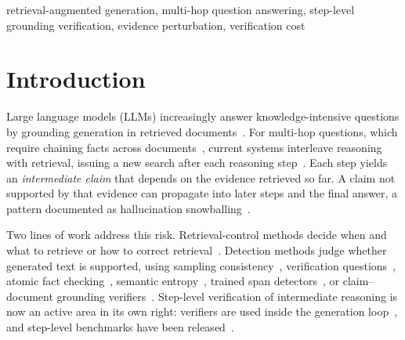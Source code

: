 \documentclass[conference]{IEEEtran}
\begin{document}
\begin{IEEEkeywords}
retrieval-augmented generation, multi-hop question answering, step-level grounding verification, evidence perturbation, verification cost
\end{IEEEkeywords}

\section{Introduction}
Large language models (LLMs) increasingly answer knowledge-intensive questions by grounding generation in retrieved documents~\cite{lewis2020rag}. For multi-hop questions, which require chaining facts across documents~\cite{yang2018hotpotqa,ho2020twowiki,trivedi2022musique}, current systems interleave reasoning with retrieval, issuing a new search after each reasoning step~\cite{yao2023react,trivedi2023ircot,jiang2023flare,jin2025searchr1}. Each step yields an \emph{intermediate claim} that depends on the evidence retrieved so far. A claim not supported by that evidence can propagate into later steps and the final answer, a pattern documented as hallucination snowballing~\cite{zhang2024snowball}.

Two lines of work address this risk. Retrieval-control methods decide when and what to retrieve or how to correct retrieval~\cite{asai2024selfrag,yan2024crag,jeong2024adaptive}. Detection methods judge whether generated text is supported, using sampling consistency~\cite{manakul2023selfcheckgpt}, verification questions~\cite{dhuliawala2024cove}, atomic fact checking~\cite{min2023factscore}, semantic entropy~\cite{farquhar2024semantic}, trained span detectors~\cite{niu2024ragtruth}, or claim--document grounding verifiers~\cite{honovich2022true,zha2023alignscore,tang2024minicheck}. Step-level verification of intermediate reasoning is now an active area in its own right: verifiers are used inside the generation loop~\cite{zhao2023verifyedit,xu2024searchain,asai2024selfrag,kwon2026safe,kim2026prostep}, and step-level benchmarks have been released~\cite{jacovi2024reveal,ji2026stepgap,pham2026grace,chu2026locally}.
\end{document}

